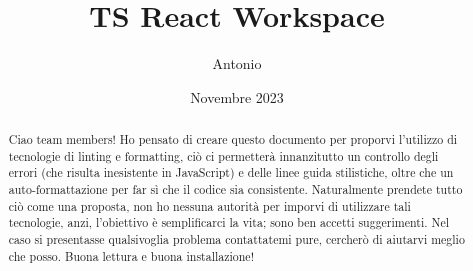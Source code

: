 \documentclass{article}
\title{TS React Workspace}
\author{Antonio}
\date{Novembre 2023}
\numberwithin{footnote}{section}
\begin{document}
\maketitle

\begin{abstract}
Ciao team members! Ho pensato di creare questo documento per proporvi l'utilizzo
di tecnologie di linting e formatting, ciò ci permetterà innanzitutto un controllo
degli errori (che risulta inesistente in JavaScript) e delle linee guida stilistiche, oltre che un auto-formattazione per far sì che il codice sia consistente. Naturalmente prendete tutto ciò come una proposta, non ho nessuna 
autorità per imporvi di utilizzare tali tecnologie, anzi, l'obiettivo è
semplificarci la vita; sono ben accetti suggerimenti. Nel caso si presentasse qualsivoglia problema contattatemi pure, cercherò di aiutarvi meglio che posso. Buona lettura e buona installazione!
\end{abstract}

\tableofcontents


\end{document}

